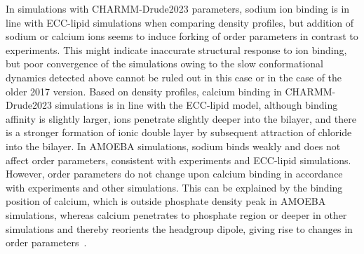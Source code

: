 \documentclass[journal=jacsat,manuscript=article,layout=singlecolumn]{achemso}
\begin{document}
In simulations with CHARMM-Drude2023 parameters, sodium ion binding is in line with ECC-lipid simulations when comparing density profiles,
but addition of sodium or calcium ions seems to induce forking of order parameters in contrast to experiments. 
This might indicate inaccurate structural response to ion binding, but poor convergence of the simulations owing to the slow conformational dynamics detected above cannot be ruled out in this case or in the case of the older 2017 version.
Based on density profiles, calcium binding in CHARMM-Drude2023 simulations is in line with the ECC-lipid model, although binding affinity is slightly larger, 
ions penetrate slightly
deeper into the bilayer, and there is a stronger formation of ionic double layer by subsequent attraction of chloride into the bilayer. 
In AMOEBA simulations, sodium binds weakly and does not affect order parameters, consistent with experiments and ECC-lipid simulations. However, order parameters do not change upon calcium binding in accordance with experiments and other simulations. This can be explained by the binding position of calcium, which is outside phosphate density peak in AMOEBA simulations, whereas calcium penetrates to phosphate region or deeper in other simulations and thereby reorients the headgroup dipole, giving rise to changes in order parameters~\cite{Catte2016}. 
\end{document}
